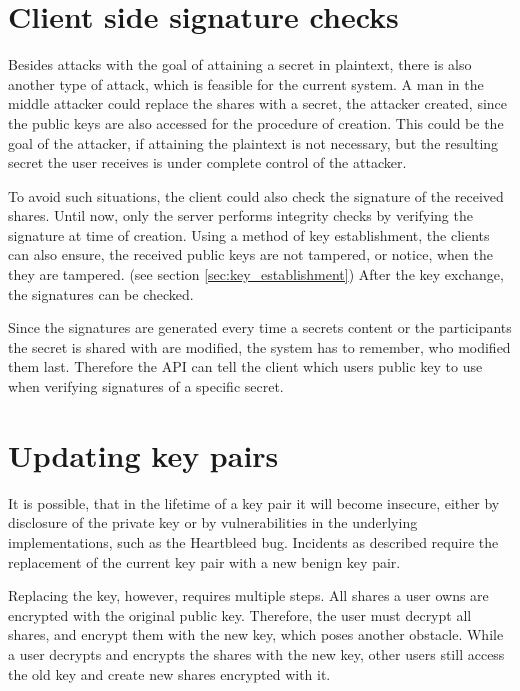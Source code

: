 \section{Client side signature checks}
\label{sec:future:client_sig_check}

Besides attacks with the goal of attaining a secret in plaintext, there is also
another type of attack, which is feasible for the current system. A man in the
middle attacker could replace the shares with a secret, the attacker created,
since the public keys are also accessed for the procedure of creation. This
could be the goal of the attacker, if attaining the plaintext is not necessary,
but the resulting secret the user receives is under complete control of the
attacker.

To avoid such situations, the client could also check the signature of the
received shares. Until now, only the server performs integrity checks by
verifying the signature at time of creation. Using a method of key
establishment, the clients can also ensure, the received public keys are not
tampered, or notice, when the they are tampered. (see section
\ref{sec:key_establishment}) After the key exchange, the signatures can be
checked.

Since the signatures are generated every time a secrets content or the
participants the secret is shared with are modified, the system has to
remember, who modified them last. Therefore the API can tell the client which
users public key to use when verifying signatures of a specific secret.

\section{Updating key pairs}
\label{sec:update_key_pair}

It is possible, that in the lifetime of a key pair it will become insecure,
either by disclosure of the private key or by vulnerabilities in the underlying
implementations, such as the Heartbleed bug. Incidents as described require
the replacement of the current key pair with a new benign key pair.

Replacing the key, however, requires multiple steps. All shares a user owns are
encrypted with the original public key. Therefore, the user must decrypt all
shares, and encrypt them with the new key, which poses another obstacle. While
a user decrypts and encrypts the shares with the new key, other users still
access the old key and create new shares encrypted with it.

